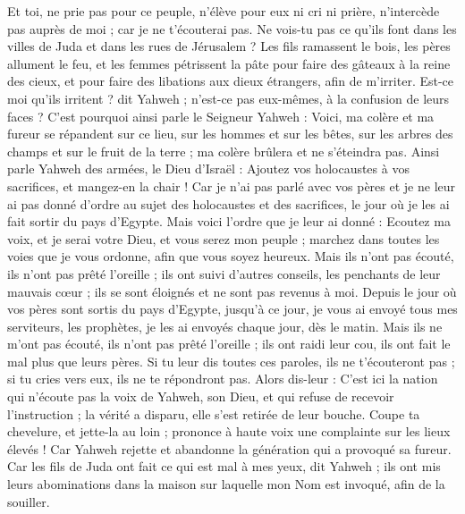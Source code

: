 \begin{multicols}{2}
Et toi, ne prie pas pour ce peuple, n'élève pour eux ni cri ni prière, n'intercède pas auprès de moi ; car je ne t'écouterai pas.
Ne vois-tu pas ce qu'ils font dans les villes de Juda et dans les rues de Jérusalem ?
Les fils ramassent le bois, les pères allument le feu, et les femmes pétrissent la pâte pour faire des gâteaux à la reine des cieux, et pour faire des libations aux dieux étrangers, afin de m'irriter.
Est-ce moi qu'ils irritent ? dit Yahweh ; n'est-ce pas eux-mêmes, à la confusion de leurs faces ?
C'est pourquoi ainsi parle le Seigneur Yahweh : Voici, ma colère et ma fureur se répandent sur ce lieu, sur les hommes et sur les bêtes, sur les arbres des champs et sur le fruit de la terre ; ma colère brûlera et ne s'éteindra pas.
Ainsi parle Yahweh des armées, le Dieu d'Israël : Ajoutez vos holocaustes à vos sacrifices, et mangez-en la chair !
Car je n'ai pas parlé avec vos pères et je ne leur ai pas donné d'ordre au sujet des holocaustes et des sacrifices, le jour où je les ai fait sortir du pays d'Egypte.
Mais voici l'ordre que je leur ai donné : Ecoutez ma voix, et je serai votre Dieu, et vous serez mon peuple ; marchez dans toutes les voies que je vous ordonne, afin que vous soyez heureux.
Mais ils n'ont pas écouté, ils n'ont pas prêté l'oreille ; ils ont suivi d'autres conseils, les penchants de leur mauvais cœur ; ils se sont éloignés et ne sont pas revenus à moi.
Depuis le jour où vos pères sont sortis du pays d'Egypte, jusqu'à ce jour, je vous ai envoyé tous mes serviteurs, les prophètes, je les ai envoyés chaque jour, dès le matin.
Mais ils ne m'ont pas écouté, ils n'ont pas prêté l'oreille ; ils ont raidi leur cou, ils ont fait le mal plus que leurs pères.
Si tu leur dis toutes ces paroles, ils ne t'écouteront pas ; si tu cries vers eux, ils ne te répondront pas.
Alors dis-leur : C'est ici la nation qui n'écoute pas la voix de Yahweh, son Dieu, et qui refuse de recevoir l'instruction ; la vérité a disparu, elle s'est retirée de leur bouche.
Coupe ta chevelure, et jette-la au loin ; prononce à haute voix une complainte sur les lieux élevés ! Car Yahweh rejette et abandonne la génération qui a provoqué sa fureur.
Car les fils de Juda ont fait ce qui est mal à mes yeux, dit Yahweh ; ils ont mis leurs abominations dans la maison sur laquelle mon Nom est invoqué, afin de la souiller.

\end{multicols}
